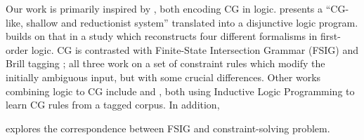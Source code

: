 


Our work is primarily inspired by \cite{lager98, lager_nivre01}, both encoding CG in logic.
\cite{lager98} presents a ``CG-like, shallow and reductionist system'' translated into a disjunctive logic program.
\cite{lager_nivre01} builds on that in a study which reconstructs
four different formalisms in first-order logic. 
CG is contrasted with Finite-State Intersection Grammar (FSIG) \cite{koskenniemi90} 
and Brill tagging \cite{brill1995}; all three work on a set of constraint rules 
which modify the initially ambiguous input, but with some crucial differences.
%
Other works combining logic to CG include
\cite{lindberg_eineborg98ilp} and \cite{asfrent14}, both using Inductive Logic Programming to learn CG rules from a tagged corpus.
In addition, \cite{lager01transformation} 

\cite{yli-jyra2001} explores the correspondence between FSIG and constraint-solving problem.







